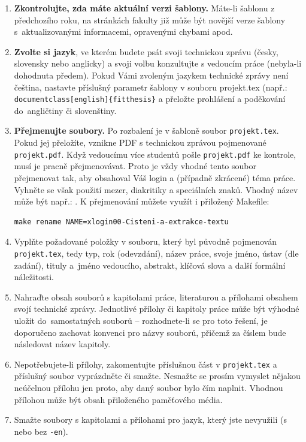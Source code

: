 \begin{enumerate}
  \item \textbf{Zkontrolujte, zda máte aktuální verzi šablony.} Máte-li šablonu z předchozího roku, na stránkách fakulty již může být novější verze šablony s~aktualizovanými informacemi, opravenými chybami apod.
  \item \textbf{Zvolte si jazyk}, ve kterém budete psát svoji technickou zprávu (česky, slovensky nebo anglicky) a svoji volbu konzultujte s vedoucím práce (nebyla-li dohodnuta předem). Pokud Vámi zvoleným jazykem technické zprávy není čeština, nastavte příslušný parametr šablony v souboru projekt.tex (např.: \verb|document|\verb|class[english]{fitthesis}| a přeložte prohlášení a poděkování do~angličtiny či slovenštiny.
  \item \textbf{Přejmenujte soubory.} Po rozbalení je v šabloně soubor \texttt{projekt.tex}. Pokud jej přeložíte, vznikne PDF s technickou zprávou pojmenované \texttt{projekt.pdf}. Když vedoucímu více studentů pošle \texttt{projekt.pdf} ke kontrole, musí je pracně přejmenovávat. Proto je vždy vhodné tento soubor přejmenovat tak, aby obsahoval Váš login a (případně zkrácené) téma práce. Vyhněte se však použití mezer, diakritiky a speciálních znaků. Vhodný název může být např.: . K přejmenování můžete využít i přiložený Makefile:
\begin{verbatim}
make rename NAME=xlogin00-Cisteni-a-extrakce-textu
\end{verbatim}
  \item Vyplňte požadované položky v souboru, který byl původně pojmenován \texttt{projekt.tex}, tedy typ, rok (odevzdání), název práce, svoje jméno, ústav (dle zadání), tituly a~jméno vedoucího, abstrakt, klíčová slova a další formální náležitosti.
  \item Nahraďte obsah souborů s kapitolami práce, literaturou a přílohami obsahem svojí technické zprávy. Jednotlivé přílohy či kapitoly práce může být výhodné uložit do~samostatných souborů -- rozhodnete-li se pro toto řešení, je doporučeno zachovat konvenci pro názvy souborů, přičemž za číslem bude následovat název kapitoly. 
  \item Nepotřebujete-li přílohy, zakomentujte příslušnou část v \texttt{projekt.tex} a příslušný soubor vyprázdněte či smažte. Nesnažte se prosím vymyslet nějakou neúčelnou přílohu jen proto, aby daný soubor bylo čím naplnit. Vhodnou přílohou může být obsah přiloženého paměťového média.
  \item Smažte soubory s kapitolami a přílohami pro jazyk, který jste nevyužili (s nebo bez \texttt{-en}).

\end{enumerate}
